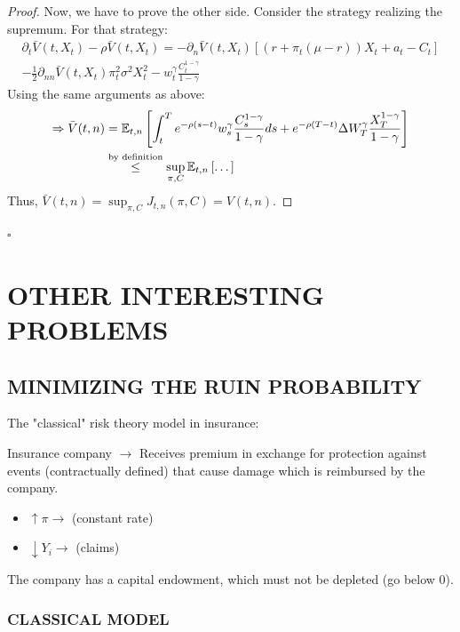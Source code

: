 \begin{proof}
Now, we have to prove the other side. Consider the strategy realizing the supremum. For that strategy:
\begin{multline*}
    \partial_t \bar{V}(t, X_t) - \rho \bar{V}(t, X_t) = -\partial_n \bar{V}(t, X_t) \left[ (r + \pi_t(\mu - r)) X_t + a_t - C_t \right] \\
    - \frac{1}{2} \partial_{nn} \bar{V}(t, X_t) \pi_t^2 \sigma^2 X_t^2 - w_t^\gamma \frac{C_t^{1-\gamma}}{1-\gamma}
\end{multline*}
Using the same arguments as above:
\begin{align*}
    \Rightarrow \bar{V}(t, n) &= \mathbb E_{t,n} \left[ \int_t^T e^{-\rho(s-t)} w_s^\gamma \frac{C_s^{1-\gamma}}{1-\gamma} ds + e^{-\rho(T-t)} \Delta W_T^\gamma \frac{X_T^{1-\gamma}}{1-\gamma} \right] \\
    &\overset{\text{by definition}}{\leq} \sup_{\pi, C} \mathbb E_{t,n} \left[ \dots \right]
\end{align*}
Thus, $\bar{V}(t, n) = \sup_{\pi, C} J_{t,n}(\pi, C) = V(t, n)$.
\end{proof} \hfill $\square$

\section*{\color{ForestGreen}OTHER INTERESTING PROBLEMS}
\subsection*{\color{red}MINIMIZING THE RUIN PROBABILITY}

The "classical" risk theory model in insurance:

Insurance company $\rightarrow$ Receives premium in exchange for protection against events (contractually defined) that cause damage which is reimbursed by the company.

\begin{itemize}
    \item $\uparrow \pi \rightarrow$  (constant rate)
    \item $\downarrow Y_i \rightarrow$  (claims)
\end{itemize}

The company has a capital endowment, which must not be depleted (go below 0).

\subsubsection*{CLASSICAL MODEL}

